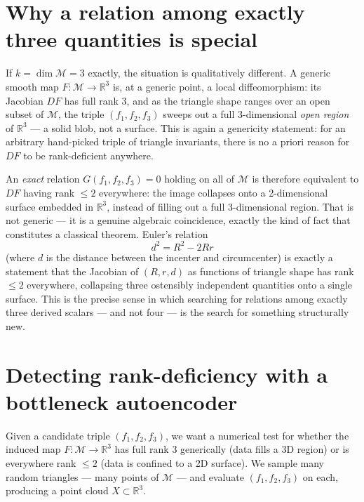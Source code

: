 \documentclass[11pt]{article}
\newcommand{\M}{\mathcal{M}}
\begin{document}
\section{Why a relation among exactly three quantities is special}

If $k = \dim \M = 3$ exactly, the situation is qualitatively different. A
generic smooth map $F : \M \to \mathbb{R}^3$ is, at a generic point, a local
diffeomorphism: its Jacobian $DF$ has full rank 3, and as the triangle shape
ranges over an open subset of $\M$, the triple $(f_1,f_2,f_3)$ sweeps out a
full 3-dimensional \emph{open region} of $\mathbb{R}^3$ — a solid blob, not a
surface. This is again a genericity statement: for an arbitrary hand-picked
triple of triangle invariants, there is no a priori reason for $DF$ to be
rank-deficient anywhere.

An \emph{exact} relation $G(f_1,f_2,f_3) = 0$ holding on all of $\M$ is
therefore equivalent to $DF$ having rank $\le 2$ everywhere: the image
collapses onto a 2-dimensional surface embedded in $\mathbb{R}^3$, instead of
filling out a full 3-dimensional region. That is not generic — it is a
genuine algebraic coincidence, exactly the kind of fact that constitutes a
classical theorem. Euler's relation
\[
  d^2 = R^2 - 2Rr
\]
(where $d$ is the distance between the incenter and circumcenter) is exactly
a statement that the Jacobian of $(R, r, d)$ as functions of triangle shape
has rank $\le 2$ everywhere, collapsing three ostensibly independent
quantities onto a single surface. This is the precise sense in which
searching for relations among exactly three derived scalars — and not four —
is the search for something structurally new.

\section{Detecting rank-deficiency with a bottleneck autoencoder}

Given a candidate triple $(f_1,f_2,f_3)$, we want a numerical test for
whether the induced map $F : \M \to \mathbb{R}^3$ has full rank 3 generically
(data fills a 3D region) or is everywhere rank $\le 2$ (data is confined to a
2D surface). We sample many random triangles — many points of $\M$ — and
evaluate $(f_1,f_2,f_3)$ on each, producing a point cloud
$X \subset \mathbb{R}^3$.
\end{document}
